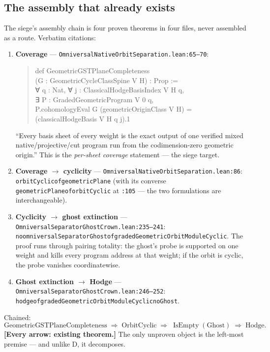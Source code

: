 \documentclass[11pt]{article}
\renewcommand{\_}{\textunderscore\allowbreak}
\newcommand{\status}[1]{\textbf{[#1]}}
\begin{document}
\subsection{The assembly that already exists}

The siege's assembly chain is four proven theorems in four files, never
assembled as a route. Verbatim citations:

\begin{enumerate}[leftmargin=2em]
\item \textbf{Coverage} --- \texttt{OmniversalNativeOrbitSeparation.lean:65--70}:
\begin{quote}\small\ttfamily
def GeometricGSTPlaneCompleteness\\
\phantom{~}(G : GeometricCycleClassSpine V H) : Prop :=\\
\phantom{~}∀ q : Nat, ∀ j : ClassicalHodgeBasisIndex V H q,\\
\phantom{~~}∃ P : GradedGeometricProgram V 0 q,\\
\phantom{~~~}P.cohomologyEval G (geometricOriginClass V H) =\\
\phantom{~~~~}(classicalHodgeBasis V H q j).1
\end{quote}
``Every basis sheet of every weight is the exact output of one verified
mixed native/projective/cut program run from the codimension-zero geometric
origin.'' This is the \emph{per-sheet coverage} statement --- the siege target.
\item \textbf{Coverage $\to$ cyclicity} --- \texttt{OmniversalNativeOrbitSeparation.lean:86}:
\texttt{orbitCyclic\_of\_geometricPlane} (with its converse
\texttt{geometricPlane\_of\_orbitCyclic} at \texttt{:105} --- the two
formulations are interchangeable).
\item \textbf{Cyclicity $\to$ ghost extinction} ---
\texttt{OmniversalSeparatorGhostCrown.lean:235--241}:
\texttt{no\_omniversalSeparatorGhost\_of\_gradedGeometricOrbitModuleCyclic}.
The proof runs through pairing totality: the ghost's probe is supported on one
weight and kills every program address at that weight; if the orbit is cyclic,
the probe vanishes coordinatewise.
\item \textbf{Ghost extinction $\to$ Hodge} ---
\texttt{OmniversalSeparatorGhostCrown.lean:246--252}:
\texttt{hodge\_of\_gradedGeometricOrbitModuleCyclic\_noGhost}.
\end{enumerate}

Chained:
\[
\text{GeometricGSTPlaneCompleteness}
\;\Longrightarrow\;
\text{OrbitCyclic}
\;\Longrightarrow\;
\operatorname{IsEmpty}(\text{Ghost})
\;\Longrightarrow\;
\text{Hodge}.
\]
\status{Every arrow: existing theorem.} The only unproven object is the
left-most premise --- and unlike D, it decomposes.
\end{document}
